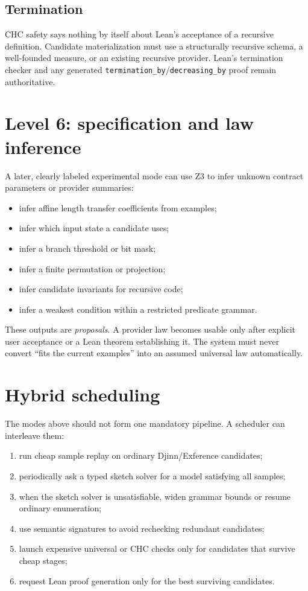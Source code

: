 \documentclass[11pt,oneside]{report}
\newcommand{\code}[1]{\texttt{#1}}
\begin{document}
\subsection{Termination}

CHC safety says nothing by itself about Lean's acceptance of a recursive definition. Candidate materialization must use a structurally recursive schema, a well-founded measure, or an existing recursive provider. Lean's termination checker and any generated \code{termination\_by}/\code{decreasing\_by} proof remain authoritative.

\section{Level 6: specification and law inference}

A later, clearly labeled experimental mode can use Z3 to infer unknown contract parameters or provider summaries:

\begin{itemize}[leftmargin=2em]
\item infer affine length transfer coefficients from examples;
\item infer which input state a candidate uses;
\item infer a branch threshold or bit mask;
\item infer a finite permutation or projection;
\item infer candidate invariants for recursive code;
\item infer a weakest condition within a restricted predicate grammar.
\end{itemize}

These outputs are \emph{proposals}. A provider law becomes usable only after explicit user acceptance or a Lean theorem establishing it. The system must never convert ``fits the current examples'' into an assumed universal law automatically.

\section{Hybrid scheduling}

The modes above should not form one mandatory pipeline. A scheduler can interleave them:

\begin{enumerate}[leftmargin=2em]
\item run cheap sample replay on ordinary Djinn/Exference candidates;
\item periodically ask a typed sketch solver for a model satisfying all samples;
\item when the sketch solver is unsatisfiable, widen grammar bounds or resume ordinary enumeration;
\item use semantic signatures to avoid rechecking redundant candidates;
\item launch expensive universal or CHC checks only for candidates that survive cheap stages;
\item request Lean proof generation only for the best surviving candidates.
\end{enumerate}
\end{document}
